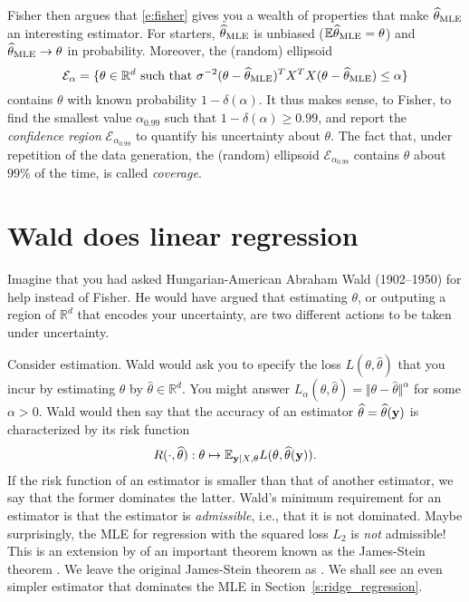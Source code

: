 Fisher then argues that \eqref{e:fisher} gives you a wealth of properties that make $\widehat{\theta}_{\text{MLE}}$ an interesting estimator.
For starters, $\widehat{\theta}_{\text{MLE}}$ is unbiased ($\mathbb E \widehat{\theta}_{\text{MLE}} = \theta$)
and $\widehat{\theta}_{\text{MLE}} \rightarrow \theta$ in probability. 
Moreover, the (random) ellipsoid 
$$
\mathcal{E}_\alpha = \{\theta\in\mathbb{R}^d \text{ such that }\sigma^{-2}(\theta-\widehat{\theta}_{\text{MLE}})^TX^T X(\theta-\widehat{\theta}_{\text{MLE}}) \leq \alpha\} 
$$
contains $\theta$ with known probability $1-\delta(\alpha)$.
It thus makes sense, to Fisher, to find the smallest value $\alpha_{0.99}$ such that $1-\delta(\alpha)\geq 0.99$, and report the \emph{confidence region} $\mathcal{E}_{\alpha_0.99}$ to quantify his uncertainty about $\theta$. 
The fact that, under repetition of the data generation, the (random) ellipsoid $\mathcal{E}_{\alpha_0.99}$ contains $\theta$ about $99\%$ of the time, is called \emph{coverage}.

\section{Wald does linear regression}
Imagine that you had asked Hungarian-American Abraham Wald (1902--1950) for help instead of Fisher.
He would have argued that estimating $\theta$, or outputing a region of $\mathbb{R}^d$ that encodes your uncertainty, are two different actions to be taken under uncertainty. 

Consider estimation. 
Wald would ask you to specify the loss $L(\theta,\widehat{\theta})$ that you incur by estimating $\theta$ by $\widehat{\theta}\in\mathbb{R}^d$. 
You might answer $L_\alpha(\theta,\widehat{\theta}) = \Vert\theta-\widehat{\theta}\Vert^\alpha$ for some $\alpha>0$.
Wald would then say that the accuracy of an estimator $\widehat{\theta}= \widehat{\theta}(\mathbf{y})$ is characterized by its risk function
\begin{equation}
    R(\cdot,\widehat{\theta}):\theta\mapsto \mathbb{E}_{\mathbf{y}\vert X, \theta} L(\theta,\widehat{\theta}(\mathbf{y})).
    \label{e:risk}
\end{equation}
If the risk function of an estimator is smaller than that of another estimator, we say that the former dominates the latter.
Wald's minimum requirement for an estimator is that the estimator is \emph{admissible}, i.e., that it is not dominated. 
Maybe surprisingly, the MLE for regression with the squared loss $L_2$ is \emph{not} admissible! 
This is an extension by \cite{TBC} of an important theorem known as the James-Stein theorem \citep{TBC}.
We leave the original James-Stein theorem as . 
We shall see an even simpler estimator that dominates the MLE in Section~\ref{s:ridge_regression}.

